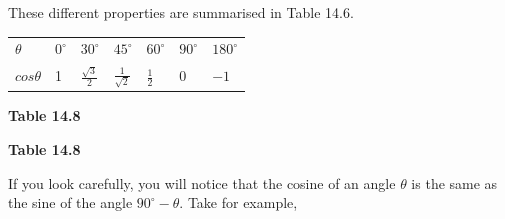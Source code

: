         \label{m39414*id85237}These different properties are summarised in Table 14.6.\par 
          \begin{table}[H]
        \begin{center}
      \label{m39414*id86909}
    \noindent
      \tablelasttail{}
      \begin{xtabular}[t]{|l|l|l|l|l|l|l|}\hline
                  $\theta $
                 &
                  ${0}^{\circ }$
                 &
                  ${30}^{\circ }$
                 &
                  ${45}^{\circ }$
                 &
                  ${60}^{\circ }$
                 &
                  ${90}^{\circ }$
                 &
                  ${180}^{\circ }$
     \tabularnewline{}
                  $cos\theta $
                 &
        1 &
                  $\frac{\sqrt{3}}{2}$
                 &
                  $\frac{1}{\sqrt{2}}$
                 &
                  $\frac{1}{2}$
                 &
        0 &
                  $-1$
     \tabularnewline{}
    \end{xtabular}
      \end{center}
    \begin{center}{\small\bfseries Table 14.8}\end{center}
    \begin{caption}{\small\bfseries Table 14.8}\end{caption}
\end{table}
    \par
        \label{m39414*id87173}If you look carefully, you will notice that the cosine of an angle $\theta $ is the same as the sine of the angle ${90}^{\circ }-\theta $. Take for example,\par 
        \label{m39414*id87206}\nopagebreak\noindent{}
          
